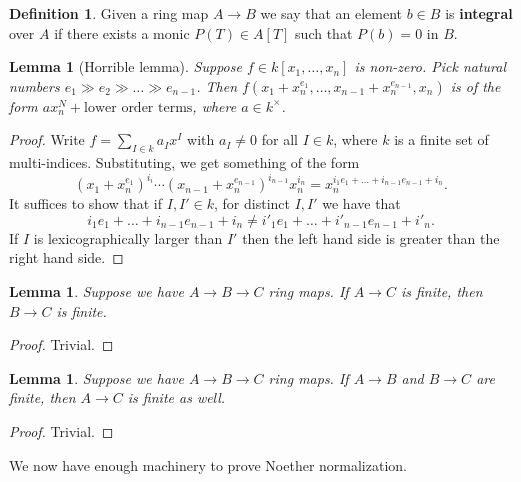 \documentclass{article}
\theoremstyle{plain}
\newtheorem{lem}[thm]{Lemma}
\theoremstyle{definition}
\newtheorem{defn}{Definition}
\theoremstyle{remark}
\begin{document}
\begin{defn}
Given a ring map $A\to B$ we say that an element $b\in B$ is \textbf{integral} over $A$ if there exists a monic $P(T)\in A[T]$ such that $P(b)=0$ in $B$.
\end{defn}

\begin{lem}[Horrible lemma]
\label{L2}
Suppose $f\in k[x_1,\ldots, x_n]$ is non-zero. Pick natural numbers $e_1\gg e_2\gg\ldots\gg e_{n-1}$. Then $f(x_1+x_n^{e_1},\ldots, x_{n-1}+x_n^{e_{n-1}}, x_n)$ is of the form $a x_n^N+\text{lower order terms}$, where $a\in k^\times$.
\end{lem}
\begin{proof}
Write $f=\sum_{I\in k}a_I x^I$ with $a_I\neq 0$ for all $I\in k$, where $k$ is a finite set of multi-indices. Substituting, we get something of the form
\[(x_1+x_n^{e_1})^{i_i}\cdots (x_{n-1}+x_n^{e_{n-1}})^{i_{n-1}}x_n^{i_n}=x_n^{i_1e_1+\ldots+i_{n-1}e_{n-1}+i_n}.\]
It suffices to show that if $I,I'\in k$, for distinct $I,I'$ we have that
\[i_1e_1+\ldots+i_{n-1}e_{n-1}+i_n\neq i'_1e_1+\ldots+ i'_{n-1}e_{n-1}+i'_n.\]
If $I$ is lexicographically larger than $I'$ then the left hand side is greater than the right hand side.
\end{proof}

\begin{lem}
\label{L3}
Suppose we have $A\to B\to C$ ring maps. If $A\to C$ is finite, then $B\to C$ is finite.
\end{lem}
\begin{proof}
Trivial.
\end{proof}

\begin{lem}
\label{L4}
Suppose we have $A\to B\to C$ ring maps. If $A\to B$ and $B\to C$ are finite, then $A\to C$ is finite as well.
\end{lem}
\begin{proof}
Trivial.
\end{proof}

We now have enough machinery to prove Noether normalization.
\end{document}
